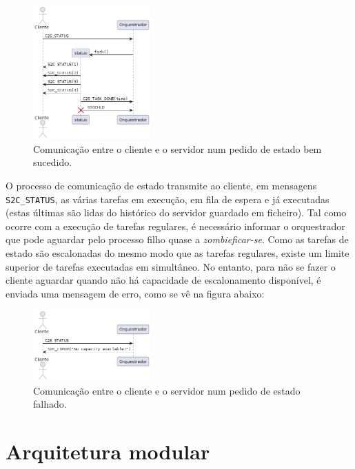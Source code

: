 \documentclass[11pt]{article}
\begin{document}
\begin{figure}[H]
    \centering
    \includegraphics[width=0.4\textwidth]{report_figures/CommunicationStatus.png}
    \caption{Comunicação entre o cliente e o servidor num pedido de estado bem sucedido.}
\end{figure}

O processo de comunicação de estado transmite ao cliente, em mensagens \texttt{S2C\_STATUS}, as
várias tarefas em execução, em fila de espera e já executadas (estas últimas são lidas do histórico
do servidor guardado em ficheiro). Tal como ocorre com a execução de tarefas regulares, é
necessário informar o orquestrador que pode aguardar pelo processo filho quase a
\emph{zombieficar-se}. Como as tarefas de estado são escalonadas do mesmo modo que as tarefas
regulares, existe um limite superior de tarefas executadas em simultâneo. No entanto, para não se
fazer o cliente aguardar quando não há capacidade de escalonamento disponível, é enviada uma
mensagem de erro, como se vê na figura abaixo:

\begin{figure}[H]
    \centering
    \includegraphics[width=0.4\textwidth]{report_figures/CommunicationStatusFailure.png}
    \caption{Comunicação entre o cliente e o servidor num pedido de estado falhado.}
\end{figure}

\section{Arquitetura modular}
\end{document}
